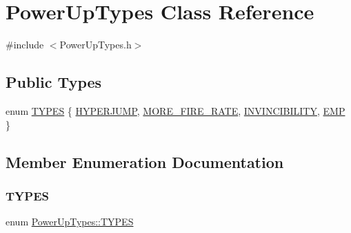 \hypertarget{class_power_up_types}{}\section{Power\+Up\+Types Class Reference}
\label{class_power_up_types}


{\ttfamily \#include $<$Power\+Up\+Types.\+h$>$}

\subsection*{Public Types}
\begin{DoxyCompactItemize}
\item 
enum \hyperlink{class_power_up_types_a9dd8d899294cc9129d2ed76cd834a3c2}{T\+Y\+P\+ES} \{ \hyperlink{class_power_up_types_a9dd8d899294cc9129d2ed76cd834a3c2af2eb8b16280961a293e62f5a78c70cd3}{H\+Y\+P\+E\+R\+J\+U\+MP}, 
\hyperlink{class_power_up_types_a9dd8d899294cc9129d2ed76cd834a3c2a1592f8286c19e266a7d153f39c9c631d}{M\+O\+R\+E\+\_\+\+F\+I\+R\+E\+\_\+\+R\+A\+TE}, 
\hyperlink{class_power_up_types_a9dd8d899294cc9129d2ed76cd834a3c2a5e487f85188866dc183ef6372a91adaa}{I\+N\+V\+I\+N\+C\+I\+B\+I\+L\+I\+TY}, 
\hyperlink{class_power_up_types_a9dd8d899294cc9129d2ed76cd834a3c2aef2887468841e889dfa02d355bf5197a}{E\+MP}
 \}
\end{DoxyCompactItemize}


\subsection{Member Enumeration Documentation}
\hypertarget{class_power_up_types_a9dd8d899294cc9129d2ed76cd834a3c2}{}\label{class_power_up_types_a9dd8d899294cc9129d2ed76cd834a3c2} 
\subsubsection{\texorpdfstring{T\+Y\+P\+ES}{TYPES}}
{\footnotesize\ttfamily enum \hyperlink{class_power_up_types_a9dd8d899294cc9129d2ed76cd834a3c2}{Power\+Up\+Types\+::\+T\+Y\+P\+ES}}

